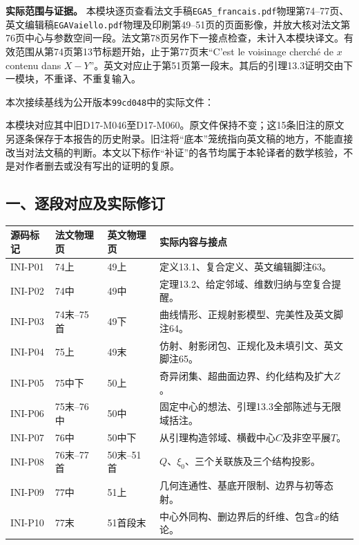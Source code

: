 \documentclass[UTF8,a4paper]{ctexbook}
\begin{document}
\noindent\textbf{实际范围与证据。}
本模块逐页查看法文手稿\texttt{EGA5\_francais.pdf}物理第74--77页、英文编辑稿\texttt{EGAVaiello.pdf}物理及印刷第49--51页的页面影像，并放大核对法文第76页中心与参数空间一段。法文第78页另作下一接点检查，未计入本模块译文。有效范围从第74页第13节标题开始，止于第77页末“C'est le voisinage cherch\'e de $x$ contenu dans $X-Y$”。英文对应止于第51页第一段末。其后的引理13.3证明交由下一模块，不重译、不重复输入。

本次接续基线为公开版本\texttt{99cd048}中的实际文件：
\par\noindent
{}
\par\smallskip
本模块对应其中旧D17-M046至D17-M060。原文件保持不变；这15条旧注的原文另逐条保存于本报告的历史附录。旧注将“底本”笼统指向英文稿的地方，不能直接改当对法文稿的判断。本文以下标作“补证”的各节均属于本轮译者的数学核验，不是对作者删去或没有写出的证明的复原。

\subsection*{一、逐段对应及实际修订}

\begin{longtable}{@{}p{.12\linewidth}p{.17\linewidth}p{.17\linewidth}p{.42\linewidth}@{}}
\toprule
源码标记 & 法文物理页 & 英文物理页 & 实际内容与接点\\
\midrule
\endhead
INI-P01 & 74上 & 49上 & 定义13.1、复合定义、英文编辑脚注63。\\
INI-P02 & 74中 & 49中 & 定理13.2、给定邻域、维数归纳与空复合提醒。\\
INI-P03 & 74末--75首 & 49下 & 曲线情形、正规射影模型、完美性及英文脚注64。\\
INI-P04 & 75上 & 49末 & 仿射、射影闭包、正规化及未填引文、英文脚注65。\\
INI-P05 & 75中下 & 50上 & 奇异闭集、超曲面边界、约化结构及扩大$Z$。\\
INI-P06 & 75末--76中 & 50中 & 固定中心的想法、引理13.3全部陈述与无限域括注。\\
INI-P07 & 76中 & 50中下 & 从引理构造邻域、横截中心$C$及非空平展$T$。\\
INI-P08 & 76末--77首 & 50末--51首 & $Q$、$\xi_0$、三个关联族及三个结构投影。\\
INI-P09 & 77中 & 51上 & 几何连通性、基底开限制、边界与初等态射。\\
INI-P10 & 77末 & 51首段末 & 中心外同构、删边界后的纤维、包含$x$的结论。\\
\bottomrule
\end{longtable}
\end{document}
